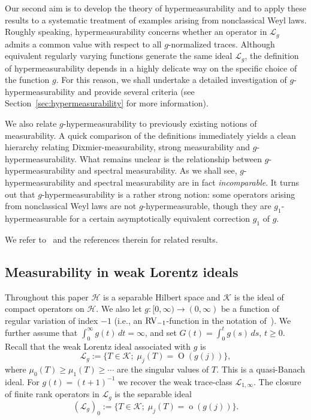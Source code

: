\documentclass[10pt, a4paper]{amsart}
\newcommand{\sL}{\mathscr{L}}
\newcommand{\sH}{\mathscr{H}}
\newcommand{\sK}{\mathscr{K}}
\newcommand{\op}{\operatorname}
\numberwithin{equation}{section}
\theoremstyle{definition}
\theoremstyle{remark}
\newcommand{\RV}{\textup{RV}}
\begin{document}
Our second aim is to develop the theory of hypermeasurability and to apply these results to a systematic treatment of examples arising from nonclassical Weyl laws. Roughly speaking, hypermeasurability concerns whether an operator in $\sL_g$ admits a common value with respect to all $g$-normalized traces. Although equivalent regularly varying functions generate the same ideal $\sL_g$, the definition of hypermeasurability depends in a highly delicate way on the specific choice of the function $g$. For this reason, we shall undertake a detailed investigation of $g$-hypermeasurability and provide several criteria (see Section~\ref{sec:hypermeasurability} for more information). 

We also relate $g$-hypermeasurability to previously existing notions of measurability. A quick comparison of the definitions immediately yields a clean hierarchy relating Dixmier-measurability, strong measurability and $g$-hypermeasurability. What remains unclear is the relationship between $g$-hypermeasurability and spectral measurability. As we shall see, $g$-hypermeasurability and spectral measurability are in fact \emph{incomparable}. 
It turns out that $g$-hypermeasurability is a rather strong notion: some operators arising from nonclassical Weyl laws are not $g$-hypermeasurable, though they are $g_1$-hypermeasurable for a certain asymptotically equivalent correction $g_1$ of $g$.

We refer to~\cite{GS:JFA14, GU:JMAA20, LU:JMAA25, McD:arXiv26, SS:JFA13, TU:JMAA27} and the references therein for related results.

\subsection{Measurability in weak Lorentz ideals}
Throughout this paper $\sH$ is a separable Hilbert space and $\sK$ is the ideal of compact operators on $\sH$. We also let 
 $g:[0,\infty)\rightarrow(0,\infty)$ be a  function of regular variation of index $-1$ (i.e., an  $\RV_{-1}$-function in the notation of~\cite{PT:Part1}). We further assume that $\int_0^\infty g(t)\,dt=\infty$, and set $G(t)=\int_0^t g(s)\,ds$, $t\geq 0$. Recall that the weak Lorentz ideal associated with $g$ is 
\[
  \sL_g := \bigl\{T \in \sK;\; \mu_j(T) = \op{O}(g(j))\bigr\},
\]
where $\mu_0(T)\geq \mu_1(T)\geq \cdots$ are the singular values of $T$. This is a quasi-Banach ideal. For $g(t)=(t+1)^{-1}$ we recover the weak trace-class $\sL_{1,\infty}$. The closure of finite rank operators in $\sL_g$ is the separable ideal 
\[
(\sL_g)_0:=  \big\{T \in \sK;\; \mu_j(T) = \op{o}(g(j))\big\}.
\]
\end{document}
